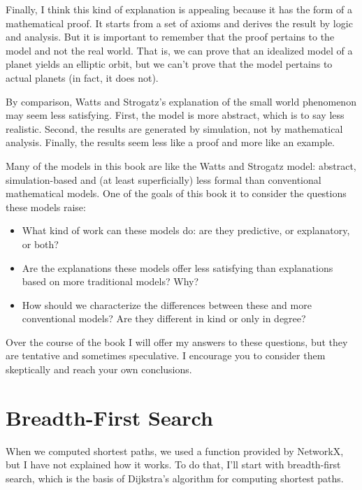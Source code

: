 \documentclass[12pt]{book}
\theoremstyle{exercise}
\begin{document}
Finally, I think this kind of explanation is appealing because
it has the form of a mathematical proof.  It starts from a
set of axioms and derives the result by logic and analysis.
But it is important to remember that the proof pertains to the
model and not the real world.  That is, we can prove that
an idealized model of a planet yields an elliptic orbit, but
we can't prove that the model pertains to actual planets (in
fact, it does not).

By comparison, Watts and Strogatz's explanation of the small
world phenomenon may seem less satisfying.  First, the model
is more abstract, which is to say less realistic.  Second,
the results are generated by simulation, not by mathematical
analysis.  Finally, the results seem less like a proof and
more like an example.

Many of the models in this book are like the Watts and Strogatz model:
abstract, simulation-based and (at least superficially) less formal
than conventional mathematical models.  One of the goals of this book
it to consider the questions these models raise:


\begin{itemize}

\item What kind of work can these models do: are they predictive, or
  explanatory, or both?

\item Are the explanations these models offer less satisfying than
  explanations based on more traditional models?  Why?

\item How should we characterize the differences between these and
  more conventional models?  Are they different in kind or only in
  degree?

\end{itemize}

Over the course of the book I will offer my answers
to these questions, but they are tentative and sometimes
speculative.  I encourage you to consider them skeptically
and reach your own conclusions.


\section{Breadth-First Search}
\label{bfs}

When we computed shortest paths, we used a function provided by
NetworkX, but I have not explained how it works.  To do that, I'll
start with breadth-first search, which is the basis of Dijkstra's
algorithm for computing shortest paths.
\end{document}
